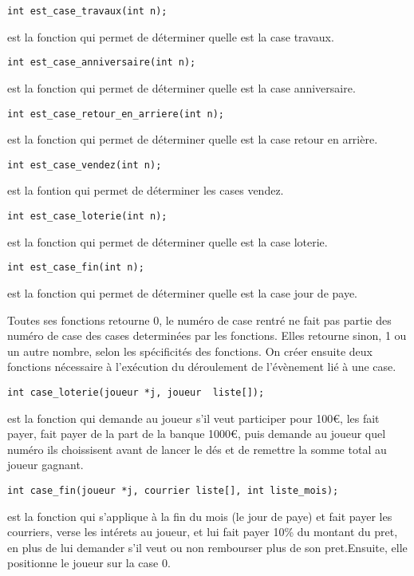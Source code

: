 \documentclass[a4paper, 11pt]{report}
\begin{document}
\begin{verbatim}
int est_case_travaux(int n);
\end{verbatim}
est la fonction qui permet de déterminer quelle est la case travaux.

\begin{verbatim}
int est_case_anniversaire(int n);
\end{verbatim}
est la fonction qui permet de déterminer quelle est la case anniversaire.

\begin{verbatim}
int est_case_retour_en_arriere(int n);
\end{verbatim}
est la fonction qui permet de déterminer quelle est la case retour en arrière.

\begin{verbatim}
int est_case_vendez(int n);
\end{verbatim}
est la fontion qui permet de déterminer les cases vendez.

\begin{verbatim}
int est_case_loterie(int n);
\end{verbatim}
est la fonction qui permet de déterminer quelle est la case loterie.

\begin{verbatim}
int est_case_fin(int n);
\end{verbatim}
est la fonction qui permet de déterminer quelle est la case jour de paye.

Toutes ses fonctions retourne 0, le numéro de case rentré ne fait pas partie des numéro de case des cases determinées par les fonctions. Elles retourne sinon, 1 ou un autre nombre, selon les spécificités des fonctions.
On créer ensuite deux fonctions nécessaire à l'exécution du déroulement de l'évènement lié à une case.

\begin{verbatim}
int case_loterie(joueur *j, joueur  liste[]);
\end{verbatim}
est la fonction qui demande au joueur s'il veut participer pour 100\euro, les fait payer, fait payer de la part de la banque 1000\euro, puis demande au joueur quel numéro ils choissisent avant de lancer le dés et de remettre la somme total au joueur gagnant.

\begin{verbatim}
int case_fin(joueur *j, courrier liste[], int liste_mois);
\end{verbatim}
est la fonction qui s'applique à la fin du mois (le jour de paye) et fait payer les courriers, verse les intérets au joueur, et lui fait payer 10\% du montant du pret, en plus de lui demander s'il veut ou non rembourser plus de son pret.Ensuite, elle positionne le joueur sur la case 0.
\end{document}
